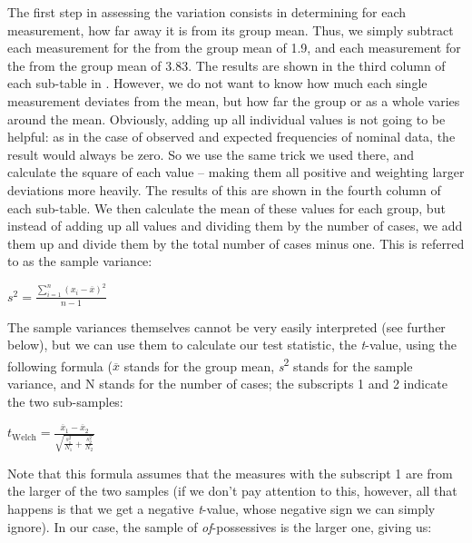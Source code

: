 The first step in assessing the variation  consists in determining for each measurement,  how far away it is from its group mean.  Thus, we simply subtract each measurement for the   from the group mean of 1.9, and each measurement for the  from the group mean of 3.83. The results are shown in the third column of each sub\hyp{}table in . However, we do not want to know how much each single measurement deviates from the mean, but how far the group  or  as a whole varies around the mean.  Obviously, adding up all individual values is not going to be helpful: as in the case of observed and expected  frequencies of nominal  data, the result would always be zero. So we use the same trick we used there, and calculate the square of each value -- making them all positive and weighting larger deviations more heavily. The results of this are shown in the fourth column of each sub\hyp{}table. We then calculate the mean  of these values for each group, but instead of adding up all values and dividing them by the number of cases, we add them up and divide them by the total number of cases minus one. This is referred to as the sample  variance:

\begin{exe}
\ex $\displaystyle{s^2=\frac{\sum _{i=1}^n(x_i-\overline{x})^2}{n-1}}$
\label{ex:formulasamplevariance}
\end{exe}

The sample variances  themselves cannot be very easily interpreted (see further below), but we can use them to calculate our test statistic, the \textit{t}-value, using the following formula ($\overline{x}$ stands for the group mean,  \textit{s}\textsuperscript{2} stands for the sample variance, and N stands for the number of cases; the subscripts 1 and 2 indicate the two sub\hyp{}samples:

\begin{exe}
\ex $\displaystyle{t_\text{Welch} = \frac{\overline{x}_1 - \overline{x}_2}{\sqrt{\frac{s_1^2}{N_1} + \frac{s_2^2}{N_2}}}}$
\label{ex:formulawelchst}
\end{exe}

Note that this formula assumes that the measures with the subscript 1 are from the larger of the two samples (if we don't pay attention to this, however, all that happens is that we get a negative \textit{t}-value, whose negative sign we can simply ignore). In our case, the sample of \textit{of}-possessives  is the larger one, giving us:

